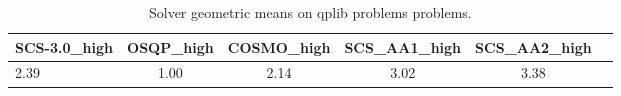 \begin{table}
\centering
\caption{Solver geometric means on qplib problems problems.}
\label{t-qplib problems-geom_mean}
\begin{tabular}{lccccc}
\toprule
 SCS-3.0\_high &  OSQP\_high &  COSMO\_high &  SCS\_AA1\_high &  SCS\_AA2\_high \\
\midrule
         2.39 &       1.00 &        2.14 &          3.02 &          3.38 \\
\bottomrule
\end{tabular}
\end{table}
